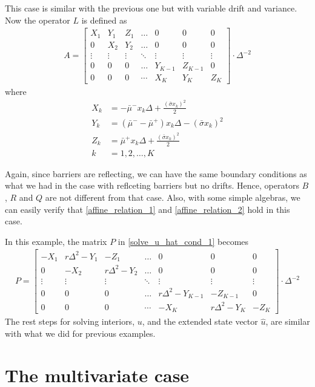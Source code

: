 \documentclass[11pt]{article}
\begin{document}
This case is similar with the previous one but with variable drift and variance. Now the operator $L$ is defined as
\begin{align}
A = \begin{bmatrix}
X_1&Y_1&Z_1&\dots&0&0&0\\
0&X_2&Y_2&\dots&0&0&0\\
\vdots&\vdots&\vdots&\ddots&\vdots&\vdots&\vdots\\
0&0&0&\dots&Y_{K-1}&Z_{K-1}&0\\
0&0&0&\cdots&X_{K}&Y_{K}&Z_{K}
\end{bmatrix}\cdot \Delta^{-2}\nonumber
\end{align}
where
\begin{align*}
X_k &= -\bar{\mu}^-x_k\Delta+\frac{(\bar{\sigma}x_k)^2}{2}\\
Y_k &= (\bar{\mu}^--\bar{\mu}^+)x_k\Delta-(\bar{\sigma}x_k)^2\\
Z_k &=\bar{\mu}^+x_k\Delta+\frac{(\bar{\sigma}x_k)^2}{2}\\
k & = 1, 2,\dots, K
\end{align*}

Again, since barriers are reflecting, we can have the same boundary conditions as what we had in the case with reflceting barriers but no drifts. Hence, operators $B$, $R$ and $Q$ are not different from that case. Also, with some simple algebras, we can easily verify that \eqref{affine_relation_1} and \eqref{affine_relation_2} hold in this case.

In this example, the matrix $P$ in \eqref{solve_u_hat_cond_1} becomes
\begin{align}
P = \begin{bmatrix}
-X_1&r\Delta^2-Y_1&-Z_1&\dots&0&0&0\\
0&-X_2&r\Delta^2-Y_2&\dots&0&0&0\\
\vdots&\vdots&\vdots&\ddots&\vdots&\vdots&\vdots\\
0&0&0&\dots&r\Delta^2-Y_{K-1}&-Z_{K-1}&0\\
0&0&0&\cdots&-X_K&r\Delta^2-Y_K&-Z_K
\end{bmatrix}\cdot \Delta^{-2}
\end{align}
The rest steps for solving interiors, $u$, and the extended state vector $\hat{u}$, are similar with what we did for previous examples.

\iffalse %
\section{The multivariate case}
\end{document}
